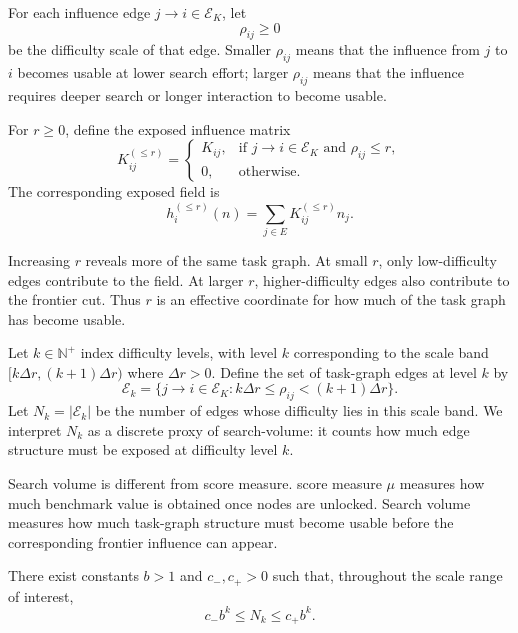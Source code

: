 \begin{definition}
\label{def:edge-difficulty-scale}
For each influence edge \(j\to i\in\mathcal E_K\), let
\[
    \rho_{ij}\ge0
\]
be the difficulty scale of that edge. Smaller \(\rho_{ij}\) means that the influence from \(j\) to \(i\) becomes usable at lower search effort; larger \(\rho_{ij}\) means that the influence requires deeper search or longer interaction to become usable.

For \(r\ge0\), define the exposed influence matrix
\[
    K^{(\le r)}_{ij}
    =
    \begin{cases}
        K_{ij}, & \text{if } j\to i\in\mathcal E_K \text{ and } \rho_{ij}\le r,\\
        0, & \text{otherwise.}
    \end{cases}
\]
The corresponding exposed field is
\[
    h_i^{(\le r)}(n)
    =
    \sum_{j\in E}K^{(\le r)}_{ij}n_j .
\]
\end{definition}

Increasing \(r\) reveals more of the same task graph. At small \(r\), only low-difficulty edges contribute to the field. At larger \(r\), higher-difficulty edges also contribute to the frontier cut. Thus \(r\) is an effective coordinate for how much of the task graph has become usable.

\begin{definition}
\label{def:search-volume-scale}
Let \(k\in \mathbb{N}^+\) index difficulty levels, with level \(k\) corresponding to the scale band \([k\Delta r,(k+1)\Delta r)\) where \(\Delta r>0\). Define the set of task-graph edges at level \(k\) by
\[
    \mathcal E_k
    =
    \{j\to i\in\mathcal E_K:
    k\Delta r\le \rho_{ij} < (k+1)\Delta r\}.
\]
Let \(N_k=|\mathcal E_k|\) be the number of edges whose difficulty lies in this scale band. We interpret \(N_k\) as a discrete proxy of search-volume: it counts how much edge structure must be exposed at difficulty level \(k\).
\end{definition}

Search volume is different from score measure. score measure \(\mu\) measures how much benchmark value is obtained once nodes are unlocked. Search volume measures how much task-graph structure must become usable before the corresponding frontier influence can appear.

\begin{assumption}
\label{ass:self-similar-edge-growth}
There exist constants \(b>1\) and \(c_-,c_+>0\) such that, throughout the scale range of interest,
\[
    c_- b^k
    \le
    N_k
    \le
    c_+ b^k .
\]
\end{assumption}

